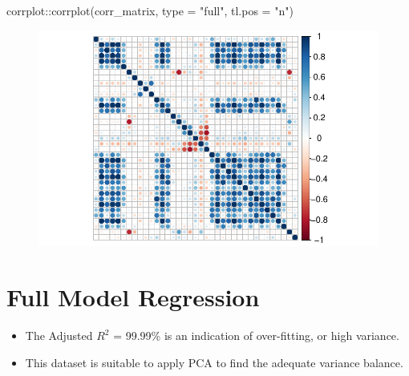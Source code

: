 \documentclass[
  letterpaper,
  DIV=11,
  numbers=noendperiod]{scrreprt}
\newenvironment{Shaded}{\begin{snugshade}}{\end{snugshade}}
\newcommand{\AttributeTok}[1]{\textcolor[rgb]{0.40,0.45,0.13}{#1}}
\newcommand{\FunctionTok}[1]{\textcolor[rgb]{0.28,0.35,0.67}{#1}}
\newcommand{\NormalTok}[1]{\textcolor[rgb]{0.00,0.23,0.31}{#1}}
\newcommand{\SpecialCharTok}[1]{\textcolor[rgb]{0.37,0.37,0.37}{#1}}
\newcommand{\StringTok}[1]{\textcolor[rgb]{0.13,0.47,0.30}{#1}}
\providecommand{\tightlist}{%
  \setlength{\itemsep}{0pt}\setlength{\parskip}{0pt}}\usepackage{longtable,booktabs,array}
\begin{document}
\begin{Shaded}
\begin{Highlighting}[]
\NormalTok{corrplot}\SpecialCharTok{::}\FunctionTok{corrplot}\NormalTok{(corr\_matrix, }\AttributeTok{type =} \StringTok{"full"}\NormalTok{, }\AttributeTok{tl.pos =} \StringTok{"n"}\NormalTok{)}
\end{Highlighting}
\end{Shaded}

\begin{figure}[H]

{\centering \includegraphics{analysis_files/figure-pdf/unnamed-chunk-14-1.pdf}

}

\end{figure}

\hypertarget{full-model-regression}{%
\section{Full Model Regression}\label{full-model-regression}}

\begin{itemize}
\tightlist
\item
  The Adjusted \(R^2\) = 99.99\% is an indication of over-fitting, or
  high variance.
\item
  This dataset is suitable to apply PCA to find the adequate variance
  balance.
\end{itemize}
\end{document}
